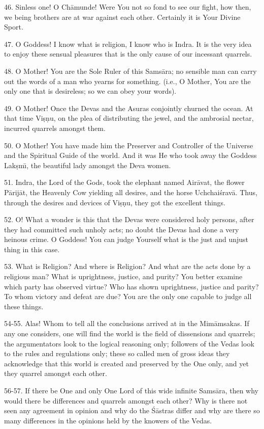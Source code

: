 46. Sinless one! O Ch\=amunde! Were You not so fond to see our fight, how then, we being brothers are at war against each other. Certainly it is Your Divine Sport.

47. O Goddess! I know what is religion, I know who is Indra. It is the very idea to enjoy these sensual pleasures that is the only cause of our incessant quarrels.

48. O Mother! You are the Sole Ruler of this Sams\=ara; no sensible man can carry out the words of a man who yearns for something. (i.e., O Mother, You are the only one that is desireless; so we can obey your words).

49. O Mother! Once the Devas and the Asuras conjointly churned the ocean. At that time Vi\d{s}\d{n}u, on the plea of distributing the jewel, and the ambrosial nectar, incurred quarrels amongst them.

50. O Mother! You have made him the Preserver and Controller of the Universe and the Spiritual Guide of the world. And it was He who took away the Goddess Lak\d{s}m\={\i}, the beautiful lady amongst the Deva women.

51. Indra, the Lord of the Gods, took the elephant named Air\=avat, the flower P\=arij\=at, the Heavenly Cow yielding all desires, and the horse Uchchai\'srav\=a. Thus, through the desires and devices of Vi\d{s}\d{n}u, they got the excellent things.

52. O! What a wonder is this that the Devas were considered holy persons, after they had committed such unholy acts; no doubt the Devas had done a very heinous crime. O Goddess! You can judge Yourself what is the just and unjust thing in this case.

53. What is Religion? And where is Religion? And what are the acts done by a religious man? What is uprightness, justice, and purity? You better examine which party has observed virtue? Who has shown uprightness, justice and parity? To whom victory and defeat are due? You are the only one capable to judge all these things.

54-55. Alas! Whom to tell all the conclusions arrived at in the Mim\=amsakas. If any one considers, one will find the world is the field of dissensions and quarrels; the argumentators look to the logical reasoning only; followers of the Vedas look to the rules and regulations only; these so called men of gross ideas they acknowledge that this world is created and preserved by the One only, and yet they quarrel amongst each other.

56-57. If there be One and only One Lord of this wide infinite Sams\=ara, then why would there be differences and quarrels amongst each other? Why is there not seen any agreement in opinion and why do the \'S\=astras differ and why are there so many differences in the opinions held by the knowers of the Vedas.

